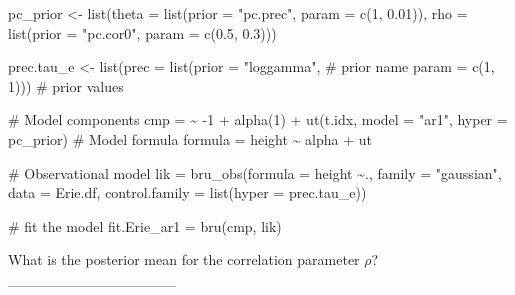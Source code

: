 \documentclass[
  letterpaper,
  DIV=11,
  numbers=noendperiod]{scrartcl}
\newenvironment{Shaded}{\begin{snugshade}}{\end{snugshade}}
\newcommand{\AttributeTok}[1]{\textcolor[rgb]{0.40,0.45,0.13}{#1}}
\newcommand{\CommentTok}[1]{\textcolor[rgb]{0.37,0.37,0.37}{#1}}
\newcommand{\DecValTok}[1]{\textcolor[rgb]{0.68,0.00,0.00}{#1}}
\newcommand{\ErrorTok}[1]{\textcolor[rgb]{0.68,0.00,0.00}{#1}}
\newcommand{\FloatTok}[1]{\textcolor[rgb]{0.68,0.00,0.00}{#1}}
\newcommand{\FunctionTok}[1]{\textcolor[rgb]{0.28,0.35,0.67}{#1}}
\newcommand{\NormalTok}[1]{\textcolor[rgb]{0.00,0.23,0.31}{#1}}
\newcommand{\OtherTok}[1]{\textcolor[rgb]{0.00,0.23,0.31}{#1}}
\newcommand{\SpecialCharTok}[1]{\textcolor[rgb]{0.37,0.37,0.37}{#1}}
\newcommand{\StringTok}[1]{\textcolor[rgb]{0.13,0.47,0.30}{#1}}
\begin{document}
\begin{Shaded}
\begin{Highlighting}[]
\NormalTok{pc\_prior }\OtherTok{\textless{}{-}} \FunctionTok{list}\NormalTok{(}\AttributeTok{theta =} \FunctionTok{list}\NormalTok{(}\AttributeTok{prior =} \StringTok{"pc.prec"}\NormalTok{, }\AttributeTok{param =} \FunctionTok{c}\NormalTok{(}\DecValTok{1}\NormalTok{, }\FloatTok{0.01}\NormalTok{)),}
                 \AttributeTok{rho =} \FunctionTok{list}\NormalTok{(}\AttributeTok{prior =} \StringTok{"pc.cor0"}\NormalTok{, }\AttributeTok{param =} \FunctionTok{c}\NormalTok{(}\FloatTok{0.5}\NormalTok{, }\FloatTok{0.3}\NormalTok{))) }

\NormalTok{prec.tau\_e }\OtherTok{\textless{}{-}} \FunctionTok{list}\NormalTok{(}\AttributeTok{prec =} \FunctionTok{list}\NormalTok{(}\AttributeTok{prior =} \StringTok{"loggamma"}\NormalTok{,   }\CommentTok{\# prior name}
                             \AttributeTok{param =} \FunctionTok{c}\NormalTok{(}\DecValTok{1}\NormalTok{, }\DecValTok{1}\NormalTok{))) }\CommentTok{\# prior values}

\CommentTok{\# Model components}
\NormalTok{cmp }\OtherTok{=}  \ErrorTok{\textasciitilde{}} \SpecialCharTok{{-}}\DecValTok{1} \SpecialCharTok{+} \FunctionTok{alpha}\NormalTok{(}\DecValTok{1}\NormalTok{) }\SpecialCharTok{+} \FunctionTok{ut}\NormalTok{(t.idx, }\AttributeTok{model =} \StringTok{"ar1"}\NormalTok{,  }\AttributeTok{hyper =}\NormalTok{ pc\_prior)}
\CommentTok{\# Model formula}
\NormalTok{formula }\OtherTok{=}\NormalTok{ height }\SpecialCharTok{\textasciitilde{}}\NormalTok{ alpha }\SpecialCharTok{+}\NormalTok{ ut}


\CommentTok{\# Observational model}
\NormalTok{lik }\OtherTok{=}  \FunctionTok{bru\_obs}\NormalTok{(}\AttributeTok{formula =}\NormalTok{ height  }\SpecialCharTok{\textasciitilde{}}\NormalTok{.,}
            \AttributeTok{family =} \StringTok{"gaussian"}\NormalTok{,}
            \AttributeTok{data =}\NormalTok{ Erie.df,}
            \AttributeTok{control.family =} \FunctionTok{list}\NormalTok{(}\AttributeTok{hyper =}\NormalTok{ prec.tau\_e))}

\CommentTok{\# fit the model}
\NormalTok{fit.Erie\_ar1 }\OtherTok{=} \FunctionTok{bru}\NormalTok{(cmp, lik)}
\end{Highlighting}
\end{Shaded}

\begin{tcolorbox}[enhanced jigsaw, bottomrule=.15mm, colback=white, opacityback=0, breakable, opacitybacktitle=0.6, title={Question}, arc=.35mm, titlerule=0mm, coltitle=black, colframe=quarto-callout-tip-color-frame, toprule=.15mm, toptitle=1mm, leftrule=.75mm, left=2mm, colbacktitle=quarto-callout-tip-color!10!white, bottomtitle=1mm, rightrule=.15mm]

What is the posterior mean for the correlation parameter \(\rho\)?
\_\_\_\_\_\_\_\_\_\_\_\_\_\_\_\_

\end{tcolorbox}
\end{document}
